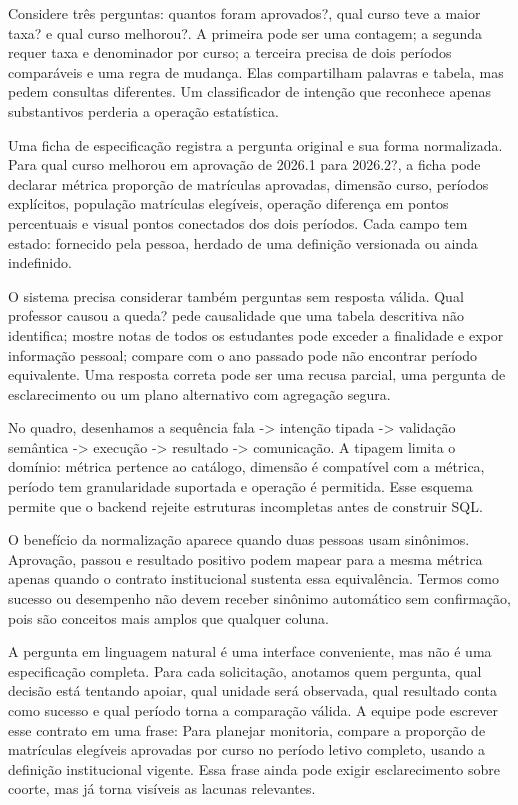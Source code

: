 Considere três perguntas: quantos foram aprovados?, qual curso teve a maior taxa? e qual curso melhorou?. A primeira pode ser uma contagem; a segunda requer taxa e denominador por curso; a terceira precisa de dois períodos comparáveis e uma regra de mudança. Elas compartilham palavras e tabela, mas pedem consultas diferentes. Um classificador de intenção que reconhece apenas substantivos perderia a operação estatística.

Uma ficha de especificação registra a pergunta original e sua forma normalizada. Para qual curso melhorou em aprovação de 2026.1 para 2026.2?, a ficha pode declarar métrica proporção de matrículas aprovadas, dimensão curso, períodos explícitos, população matrículas elegíveis, operação diferença em pontos percentuais e visual pontos conectados dos dois períodos. Cada campo tem estado: fornecido pela pessoa, herdado de uma definição versionada ou ainda indefinido.

O sistema precisa considerar também perguntas sem resposta válida. Qual professor causou a queda? pede causalidade que uma tabela descritiva não identifica; mostre notas de todos os estudantes pode exceder a finalidade e expor informação pessoal; compare com o ano passado pode não encontrar período equivalente. Uma resposta correta pode ser uma recusa parcial, uma pergunta de esclarecimento ou um plano alternativo com agregação segura.

No quadro, desenhamos a sequência fala -> intenção tipada -> validação semântica -> execução -> resultado -> comunicação. A tipagem limita o domínio: métrica pertence ao catálogo, dimensão é compatível com a métrica, período tem granularidade suportada e operação é permitida. Esse esquema permite que o backend rejeite estruturas incompletas antes de construir SQL.

O benefício da normalização aparece quando duas pessoas usam sinônimos. Aprovação, passou e resultado positivo podem mapear para a mesma métrica apenas quando o contrato institucional sustenta essa equivalência. Termos como sucesso ou desempenho não devem receber sinônimo automático sem confirmação, pois são conceitos mais amplos que qualquer coluna.

A pergunta em linguagem natural é uma interface conveniente, mas não é uma especificação completa. Para cada solicitação, anotamos quem pergunta, qual decisão está tentando apoiar, qual unidade será observada, qual resultado conta como sucesso e qual período torna a comparação válida. A equipe pode escrever esse contrato em uma frase: Para planejar monitoria, compare a proporção de matrículas elegíveis aprovadas por curso no período letivo completo, usando a definição institucional vigente. Essa frase ainda pode exigir esclarecimento sobre coorte, mas já torna visíveis as lacunas relevantes.

